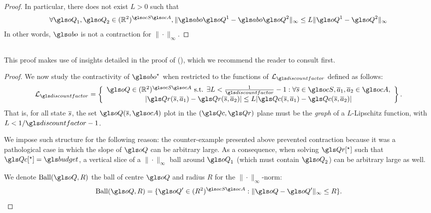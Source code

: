 \begin{subappendices}
\begin{proof}
	In particular, there does not exist $L>0$ such that
	$$\forall \oQ_1,\oQ_2\in(\Real^2)^{\ocS\ocA}, \|\abo \oQ^1 - \abo \oQ^2\|_\infty \leq L \|\oQ^1 - \oQ^2\|_\infty$$
	In other words, $\abo$ is not a contraction for $\|\cdot\|_\infty$.
\end{proof}

\subsection{}
\label{proof:contraction-with-smooth}

\begin{remark}
	\begin{leftbar}[remarkbar]
	This proof makes use of insights detailed in the proof of  (), which we recommend the reader to consult first.
	\end{leftbar}
\end{remark}

\begin{proof}
	We now study the contractivity of $\abo^{\star}$ when restricted to the functions of $\cL_{\discountfactor}$ defined as follows:
    \begin{equation}
    \cL_{\discountfactor} = \left\{\begin{array}{cc}
   \oQ\in(\Real^2)^{\ocS\ocA}\text{ s.t. }\exists L<\frac{1}{\discountfactor}-1: \forall \os\in\ocS,\oa_1,\oa_2\in\ocA,   \\
   |\Qr(\os,\oa_1) - \Qr(\os,\oa_2)| \leq L|\Qc(\os,\oa_1) - \Qc(\os,\oa_2)|
    \end{array}\right\}.
    \end{equation}
    That is, for all state $\overline{s}$, the set $\oQ(\os, \ocA)$ plot in the $(\Qc,\Qr)$ plane must be the \emph{graph} of a $L$-Lipschitz function, with $L<1/\discountfactor-1$.

    We impose such structure for the following reason: the counter-example presented above prevented contraction because it was a pathological case in which the slope of $\oQ$ can be arbitrary large. As a consequence, when solving $\Qr[^\star]$ such that $\Qc[^\star]=\budget$, a vertical slice of a $\|\cdot\|_\infty$ ball around $\oQ_1$ (which must contain $\oQ_2$) can be arbitrary large as well.


    We denote $\text{Ball}(\oQ,R)$ the ball of centre $\oQ$ and radius $R$ for the $\|\cdot\|_\infty$-norm:
    \begin{equation*}
        \text{Ball}(\oQ,R) = \{\oQ'\in(R^2)^{\ocS\ocA}: \|\oQ-\oQ'\|_\infty \leq R\}.
    \end{equation*}


\end{proof}
\end{subappendices}
